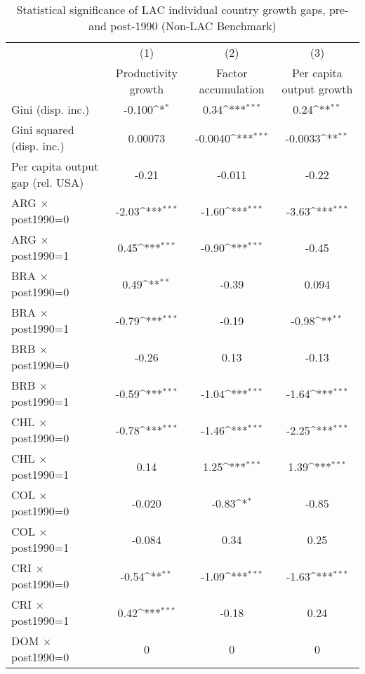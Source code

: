 \begin{sidewaystable}[htbp]\centering
\def\sym#1{\ifmmode^{#1}\else\(^{#1}\)\fi}
\caption{Statistical significance of LAC individual country growth gaps, pre- and post-1990 (Non-LAC Benchmark)}
\begin{tabular}{l*{3}{c}}
\toprule
                &\multicolumn{1}{c}{(1)}&\multicolumn{1}{c}{(2)}&\multicolumn{1}{c}{(3)}\\
                &\multicolumn{1}{c}{Productivity growth}&\multicolumn{1}{c}{Factor accumulation}&\multicolumn{1}{c}{Per capita output growth}\\
\midrule
Gini (disp. inc.)&   -0.100\sym{*}  &     0.34\sym{***}&     0.24\sym{**} \\
Gini squared (disp. inc.)&  0.00073         &  -0.0040\sym{***}&  -0.0033\sym{**} \\
Per capita output gap (rel. USA)&    -0.21         &   -0.011         &    -0.22         \\
ARG $\times$ post1990=0&    -2.03\sym{***}&    -1.60\sym{***}&    -3.63\sym{***}\\
ARG $\times$ post1990=1&     0.45\sym{***}&    -0.90\sym{***}&    -0.45         \\
BRA $\times$ post1990=0&     0.49\sym{**} &    -0.39         &    0.094         \\
BRA $\times$ post1990=1&    -0.79\sym{***}&    -0.19         &    -0.98\sym{**} \\
BRB $\times$ post1990=0&    -0.26         &     0.13         &    -0.13         \\
BRB $\times$ post1990=1&    -0.59\sym{***}&    -1.04\sym{***}&    -1.64\sym{***}\\
CHL $\times$ post1990=0&    -0.78\sym{***}&    -1.46\sym{***}&    -2.25\sym{***}\\
CHL $\times$ post1990=1&     0.14         &     1.25\sym{***}&     1.39\sym{***}\\
COL $\times$ post1990=0&   -0.020         &    -0.83\sym{*}  &    -0.85         \\
COL $\times$ post1990=1&   -0.084         &     0.34         &     0.25         \\
CRI $\times$ post1990=0&    -0.54\sym{**} &    -1.09\sym{***}&    -1.63\sym{***}\\
CRI $\times$ post1990=1&     0.42\sym{***}&    -0.18         &     0.24         \\
DOM $\times$ post1990=0&        0         &        0         &        0         \\

\end{tabular}
\end{sidewaystable}
